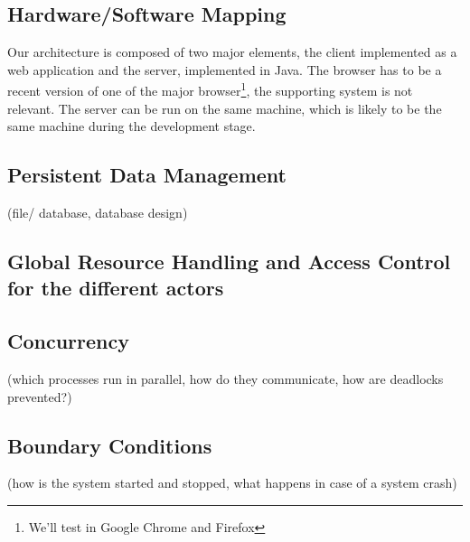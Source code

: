 \documentclass[a4paper]{article}
\begin{document}
\subsection{Hardware/Software Mapping}
Our architecture is composed of two major elements, the client implemented as a web application and the server, implemented in Java. The browser has to be a recent version of one of the major browser\footnote{We'll test in Google Chrome and Firefox}, the supporting system is not relevant. The server can be run on the same machine, which is likely to be the same machine during the development stage.

\subsection{Persistent Data Management}
(file/ database, database design)
\subsection{Global Resource Handling and Access Control for the different actors}
\subsection{Concurrency}
(which processes run in parallel, how do they communicate, how are deadlocks prevented?)
\subsection{Boundary Conditions}
(how is the system started and stopped, what happens
in case of a system crash)
\end{document}
